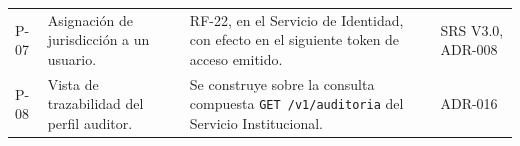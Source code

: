 \documentclass[11pt,a4paper]{article}
\begin{document}
\begin{longtable}{L{1.3cm} L{4.6cm} L{7.0cm} L{1.5cm}}
P-07 & Asignación de jurisdicción a un usuario. & RF-22, en el Servicio de Identidad, con efecto en el siguiente token de acceso emitido. & SRS V3.0, ADR-008 \\
P-08 & Vista de trazabilidad del perfil auditor. & Se construye sobre la consulta compuesta \texttt{GET /v1/auditoria} del Servicio Institucional. & ADR-016 \\
\end{longtable}

\vspace{0.4cm}
\noindent{\footnotesize\textcolor{grisTexto}{Este documento describe un sistema académico que opera exclusivamente sobre datos sintéticos. Los objetivos de disponibilidad, recuperación y capacidad aquí declarados corresponden a esa escala y no constituyen un compromiso de nivel de servicio de un sistema en producción.}}
\end{document}
